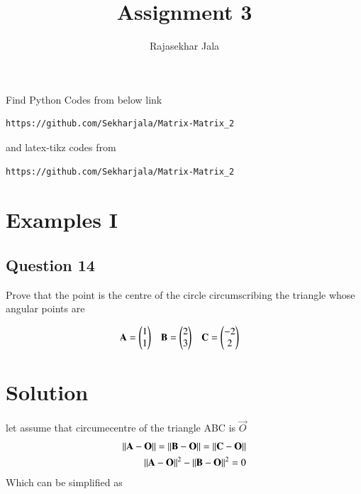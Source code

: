 \documentclass[journal,12pt,twocolumn]{IEEEtran}
\begin{document}
\def\putbox#1#2#3{\makebox[0in][l]{\makebox[#1][l]{}\raisebox{\baselineskip}[0in][0in]{\raisebox{#2}[0in][0in]{#3}}}}
     \def\rightbox#1{\makebox[0in][r]{#1}}
     \def\centbox#1{\makebox[0in]{#1}}
     \def\topbox#1{\raisebox{-\baselineskip}[0in][0in]{#1}}
     \def\midbox#1{\raisebox{-0.5\baselineskip}[0in][0in]{#1}}
\vspace{3cm}
\title{Assignment 3}
\author{Rajasekhar Jala}
\maketitle
\newpage
\bigskip
\renewcommand{\thefigure}{\theenumi}
\renewcommand{\thetable}{\theenumi}
Find Python Codes from below link 
%
\begin{lstlisting}
https://github.com/Sekharjala/Matrix-Matrix_2
\end{lstlisting}
%
and latex-tikz codes from 
%
\begin{lstlisting}
https://github.com/Sekharjala/Matrix-Matrix_2
\end{lstlisting}
%
\section{Examples I}
\subsection{Question 14}
Prove that the point  is the centre of the circle circumscribing the triangle whose angular points are 
\begin{enumerate}
\begin{align}
\mathbf{A}&=\begin{pmatrix}1\\1\end{pmatrix} & \mathbf{B}&=\begin{pmatrix}2\\3\end{pmatrix} &\mathbf{C}&=\begin{pmatrix}-2\\2\end{pmatrix}
\end{align}
\end{enumerate}
\section{Solution}
\item let assume that circumecentre of the triangle ABC is $\vec{O}$
\begin{align}
\lVert\mathbf{A}-\mathbf{O}\rVert = \lVert\mathbf{B}-\mathbf{O}\rVert = \lVert\mathbf{C}-\mathbf{O}\rVert
\\
\lVert\mathbf{A}-\mathbf{O}\rVert^2 - \lVert\mathbf{B}-\mathbf{O}\rVert^2 = 0
\end{align}
Which can be simplified as
\end{document}

